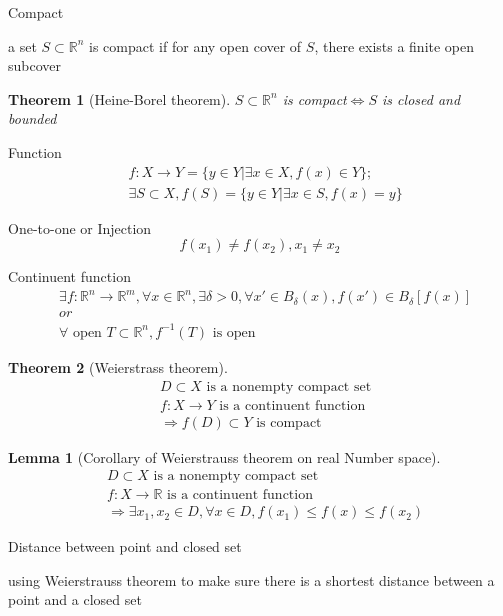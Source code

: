 \documentclass{article}
\newtheorem{theorem}{Theorem}
\newtheorem{lemma}{Lemma}
\begin{document}
Compact

a set $S\subset \mathbb{R}^{n}$ is compact if for any open cover of $S$, there exists a finite open subcover

\begin{theorem}[Heine-Borel theorem]
$S\subset \mathbb{R}^{n}$ is compact$\iff S$ is closed and bounded
\end{theorem}

Function
\begin{align}
&f:X \to Y=\{y \in Y|\exists x \in X, f(x) \in Y\};
\\& \exists S \subset X, f(S)=\{y\in Y| \exists x \in S, f(x)=y\}
\end{align}

One-to-one or Injection
$$f(x_{1})\neq f(x_{2}),x_{1}\neq x_{2}$$

Continuent function
\begin{align}
&\exists f: \mathbb{R}^{n}\to \mathbb{R}^{m},\forall x \in \mathbb{R}^{n}, \exists \delta>0,\forall x' \in B_{\delta}(x),f(x')\in B_{\delta}[f(x)] 
\\&or
\\&\forall \text{ open } T \subset \mathbb{R}^{n}, f^{-1}(T) \text{ is open}
\end{align}

\begin{theorem}[Weierstrass theorem]
\begin{align}
&D \subset X \text{ is a nonempty compact set}
\\&f:X \to Y \text { is a continuent function}
\\&\Rightarrow f(D)\subset Y \text{ is compact}
\end{align}
\end{theorem}

\begin{lemma}[Corollary of Weierstrauss theorem on real Number space]
\begin{align}
&D \subset X \text{ is a nonempty compact set}
\\&f:X \to \mathbb{R} \text { is a continuent function}
\\& \Rightarrow \exists x_{1},x_{2}\in D,\forall x \in D, f(x_{1})\leqslant f(x)
\leqslant f(x_{2})
\end{align}
\end{lemma}

Distance between point and closed set

using Weierstrauss theorem to make sure there is a shortest distance between a point and a closed set
\end{document}
